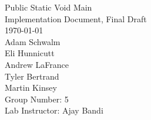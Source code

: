 \begin{titlepage}
\begin{center}

\vspace*{3.0 cm}
{\Huge Public Static Void Main}\\[0.7cm]
{\Large Implementation Document, Final Draft}\\[3.8cm]
{\Large \today}\\[0.5cm]
Adam Schwalm\\
Eli Hunnicutt\\
Andrew LaFrance\\
Tyler Bertrand\\
Martin Kinsey\\[4.0cm]

Group Number: 5\\
Lab Instructor: Ajay Bandi
  

  
\end{center}
\end{titlepage}
